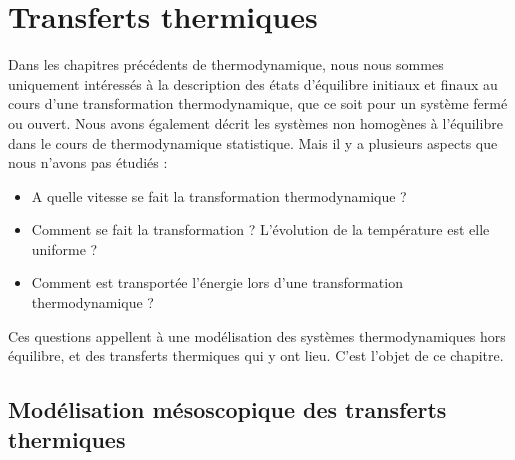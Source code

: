 \documentclass[11pt,fleqn]{book} %
\begin{document}










\setcounter{chapter}{12}

\chapter{Transferts thermiques}

Dans les chapitres précédents de thermodynamique, nous nous sommes uniquement intéressés à la description des états d'équilibre initiaux et finaux au cours d'une transformation thermodynamique, que ce soit pour un système fermé ou ouvert. Nous avons également décrit les systèmes non homogènes à l'équilibre dans le cours de thermodynamique statistique. Mais il y a plusieurs aspects que nous n'avons pas étudiés :
\begin{itemize}
	\item A quelle vitesse se fait la transformation thermodynamique ?
	\item Comment se fait la transformation ? L'évolution de la température est elle uniforme ?
	\item Comment est transportée l'énergie lors d'une transformation thermodynamique ?
\end{itemize}
Ces questions appellent à une modélisation des systèmes thermodynamiques hors équilibre, et des transferts thermiques qui y ont lieu. C'est l'objet de ce chapitre.

\section{Modélisation mésoscopique des transferts thermiques}
\end{document}
